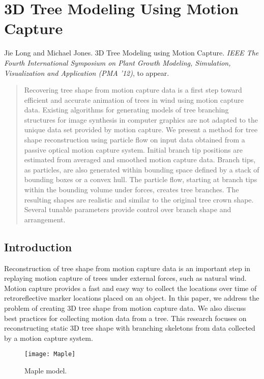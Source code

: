 \chapter{3D Tree Modeling Using Motion Capture}
\label{chap:treeparticles}

\noindent
Jie Long and Michael Jones. 3D Tree Modeling using Motion Capture. \emph{IEEE The Fourth International Symposium on Plant Growth Modeling, Simulation, Visualization and Application (PMA '12)}, to appear.

\begin{abstract}
Recovering tree shape from motion capture data is a first step toward efficient and accurate animation of trees in wind using motion capture data. Existing algorithms for generating models of tree branching structures for image synthesis in computer graphics are not adapted to the unique data set provided by motion capture. We present a method for tree shape reconstruction using particle flow on input data obtained from a passive optical motion capture system. Initial branch tip positions are estimated from averaged and smoothed motion capture data. Branch tips, as particles, are also generated within bounding space defined by a stack of bounding boxes or a convex hull. The particle flow, starting at branch tips within the bounding volume under forces, creates tree branches. The resulting shapes are realistic and similar to the original tree crown shape. Several tunable parameters provide control over branch shape and arrangement.
\end{abstract}

\section{Introduction}

Reconstruction of tree shape from motion capture data is an important step in replaying motion capture of trees under external forces, such as natural wind. Motion capture provides a fast and easy way to collect the locations over time of retroreflective marker locations placed on an object. In this paper, we address the problem of creating 3D tree shape from motion capture data. We also discuss best practices for collecting motion data from a tree. This research focuses on reconstructing static 3D tree shape with branching skeletons from data collected by a motion capture system.

\begin{figure*}[!t]
\centering
\texttt{[image: Maple]}
\caption{Maple model.}
\label{fig:treemodelssubfig2}
\end{figure*}

